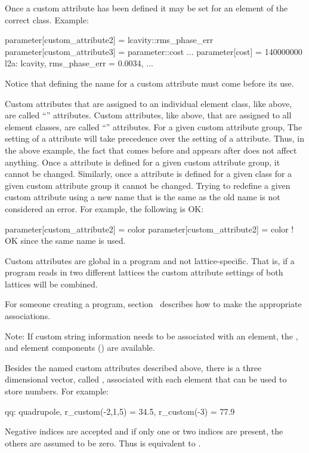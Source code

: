 {{{{{Once a custom attribute has been defined it may be set for an element
of the correct class. Example:
\begin{example}
  parameter[custom_attribute2] = lcavity::rms_phase_err
  parameter[custom_attribute3] = parameter::cost
  ...
  parameter[cost] = 140000000
  l2a: lcavity, rms_phase_err = 0.0034, ...
\end{example}
Notice that defining the name for a custom attribute must come before its use.

Custom attributes that are assigned to an individual element class, like  above, are
called ``'' attributes. Custom attributes, like  above, that are
assigned to all element classes, are called ``'' attributes. For a given custom attribute
group, The setting of a  attribute will take precedence over the setting of a
 attribute. Thus, in the above example, the fact that  comes
before  and  appears after does not affect anything. Once a
 attribute is defined for a given custom attribute group, it cannot be
changed. Similarly, once a  attribute is defined for a given class for a given
custom attribute group it cannot be changed. Trying to redefine a given custom attribute using a 
new name that is the same as the old name is not considered an error. For example, the following is OK:
\begin{example}
  parameter[custom_attribute2] = color
  parameter[custom_attribute2] = color   ! OK since the same name is used.
\end{example}

Custom attributes are global in a program and not lattice-specific. That is, if a program reads in two
different lattices the custom attribute settings of both lattices will be combined.

For someone creating a program, section~ describes how to make the appropriate
associations.

Note: If custom string information needs to be associated with an element, the , 
and  element components () are available.

Besides the named custom attributes described above, there is a three dimensional vector, called
, associated with each element that can be used to store numbers.  
For example:
\begin{example}
  qq: quadrupole, r_custom(-2,1,5) = 34.5, r_custom(-3) = 77.9
\end{example}
Negative indices are accepted and if only one or two indices are present, the others
are assumed to be zero. Thus  is equivalent to .

}}}}}
